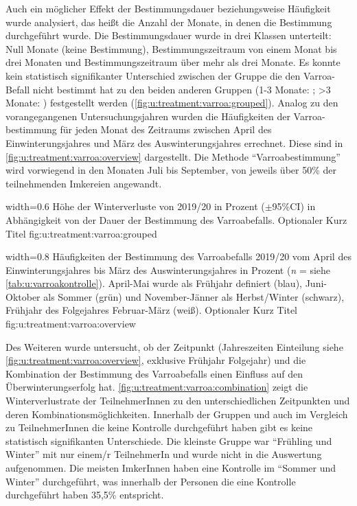 Auch ein möglicher Effekt der Bestimmungsdauer beziehungsweise Häufigkeit wurde analysiert, das heißt die Anzahl der Monate, in denen die Bestimmung durchgeführt wurde. Die Bestimmungsdauer wurde in drei Klassen unterteilt: Null Monate (keine Bestimmung), Bestimmungszeitraum von einem Monat bis drei Monaten und Bestimmungszeitraum über mehr als drei Monate. Es konnte kein statistisch signifikanter Unterschied zwischen der Gruppe die den Varroa-Befall nicht bestimmt hat  zu den beiden anderen Gruppen (1-3 Monate: ; >3 Monate: ) festgestellt werden (\cref{fig:u:treatment:varroa:grouped}). 
\newline
Analog zu den vorangegangenen Untersuchungsjahren wurden die Häufigkeiten der Varroa-bestimmung für jeden Monat des Zeitraums zwischen April des Einwinterungsjahres und März des Auswinterungsjahres errechnet. Diese sind in \cref{fig:u:treatment:varroa:overview} dargestellt. Die Methode \enquote{Varroabestimmung} wird vorwiegend in den Monaten Juli bis September, von jeweils über 50\% der teilnehmenden Imkereien angewandt.

{width=0.6\textwidth} %
{Höhe der Winterverluste von 2019/20 in Prozent ($\pm$95\%CI) in Abhängigkeit von der Dauer der Bestimmung des Varroabefalls.} %
{Optionaler Kurz Titel} %
{fig:u:treatment:varroa:grouped} %

{width=0.8\textwidth} %
{Häufigkeiten der Bestimmung des Varroabefalls 2019/20 vom April des Einwinterungsjahres bis März des Auswinterungsjahres in Prozent (\textit{n} = siehe \cref{tab:u:varroakontrolle}). April-Mai wurde als Frühjahr definiert (blau), Juni-Oktober als Sommer (grün) und November-Jänner als Herbst/Winter (schwarz), Frühjahr des Folgejahres Februar-März (weiß).} %
{Optionaler Kurz Titel} %
{fig:u:treatment:varroa:overview} %

Des Weiteren wurde untersucht, ob der Zeitpunkt (Jahreszeiten Einteilung siehe \cref{fig:u:treatment:varroa:overview}, exklusive Frühjahr Folgejahr) und die Kombination der Bestimmung des Varroabefalls einen Einfluss auf den Überwinterungserfolg hat. \cref{fig:u:treatment:varroa:combination} zeigt die Winterverlustrate der TeilnehmerInnen zu den unterschiedlichen Zeitpunkten und deren Kombinationsmöglichkeiten. Innerhalb der Gruppen und auch im Vergleich zu TeilnehmerInnen die keine Kontrolle durchgeführt haben gibt es keine statistisch signifikanten Unterschiede. Die kleinste Gruppe war \enquote{Frühling und Winter} mit nur einem/r TeilnehmerIn und wurde nicht in die Auswertung aufgenommen. Die meisten ImkerInnen haben eine Kontrolle im \enquote{Sommer und Winter} durchgeführt, was innerhalb der Personen die eine Kontrolle durchgeführt haben 35,5\% entspricht.

